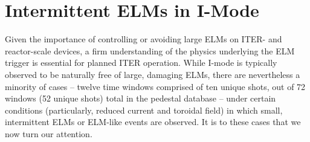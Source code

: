 \section{Intermittent ELMs in I-Mode}\label{sec:imode_elms}

Given the importance of controlling or avoiding large ELMs on ITER- and reactor-scale devices, a firm understanding of the physics underlying the ELM trigger is essential for planned ITER operation.  While I-mode is typically observed to be naturally free of large, damaging ELMs, there are nevertheless a minority of cases -- twelve time windows comprised of ten unique shots, out of 72 windows (52 unique shots) total in the pedestal database -- under certain conditions (particularly, reduced current and toroidal field) in which small, intermittent ELMs or ELM-like events are observed.  It is to these cases that we now turn our attention.

\begin{figure}[p]
 \pushtooutside
\end{figure}

